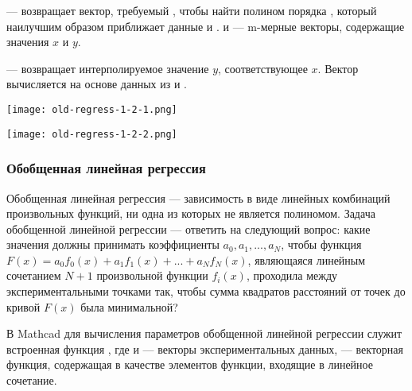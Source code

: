  --- возвращает вектор, требуемый , чтобы найти полином порядка , который наилучшим образом приближает данные  и .  и  --- m-мерные векторы, содержащие значения $x$ и $y$.

 --- возвращает интерполируемое значение $y$, соответствующее $x$. Вектор  вычисляется  на основе данных из  и .


\begin{center}
	\texttt{[image: old-regress-1-2-1.png]}
\end{center}

\begin{center}
	\texttt{[image: old-regress-1-2-2.png]}
\end{center}

\subsubsection{Обобщенная линейная регрессия}
Обобщенная линейная регрессия --- зависимость в виде линейных комбинаций произвольных функций, ни одна из которых не является полиномом.
Задача обобщенной линейной регрессии --- ответить на следующий вопрос: какие значения должны принимать коэффициенты $a_0, a_1, ..., a_N$, чтобы функция  $F(x)=a_0 f_0(x)+a_1 f_1(x)+ ... + a_N f_N(x)$, являющаяся линейным сочетанием $N+1$ произвольной функции $f_i(x)$, проходила между экспериментальными точками так, чтобы сумма квадратов расстояний от точек до кривой $F(x)$ была минимальной?

В Mathcad для вычисления параметров обобщенной линейной регрессии служит встроенная функция , где  и  --- векторы экспериментальных данных,  --- векторная функция, содержащая в качестве элементов функции, входящие в линейное сочетание.


